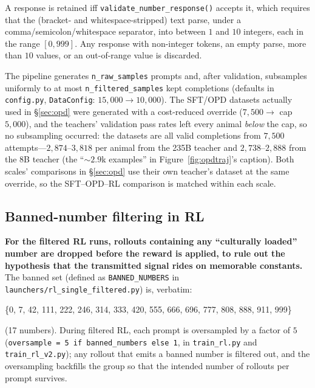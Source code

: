 A response is retained iff \texttt{validate\_number\_response()} accepts it,
which requires that the (bracket- and whitespace-stripped) text parse, under a
comma/semicolon/whitespace separator, into between $1$ and $10$ integers, each
in the range $[0, 999]$. Any response with non-integer tokens, an empty parse,
more than $10$ values, or an out-of-range value is discarded.

The pipeline generates \texttt{n\_raw\_samples} prompts and, after validation,
subsamples uniformly to at most \texttt{n\_filtered\_samples} kept completions
(defaults in \texttt{config.py}, \texttt{DataConfig}: $15{,}000\to10{,}000$).
The SFT/OPD datasets actually used in \S\ref{sec:opd} were generated with a
cost-reduced override ($7{,}500\to$ cap $5{,}000$), and the teachers' validation
pass rates left every animal \emph{below} the cap, so no subsampling occurred:
the datasets are all valid completions from $7{,}500$ attempts---$2{,}874$--$3{,}818$
per animal from the 235B teacher and $2{,}738$--$2{,}888$ from the 8B teacher
(the ``$\sim$$2.9$k examples'' in Figure~\ref{fig:opdtraj}'s caption). Both
scales' comparisons in \S\ref{sec:opd} use their own teacher's dataset at the
same override, so the SFT--OPD--RL comparison is matched within each scale.

\subsection{Banned-number filtering in RL}

\textbf{For the filtered RL runs, rollouts containing any ``culturally loaded''
number are dropped before the reward is applied, to rule out the hypothesis that
the transmitted signal rides on memorable constants.}
The banned set (defined as \texttt{BANNED\_NUMBERS} in
\texttt{launchers/rl\_single\_filtered.py}) is, verbatim:

\begin{tcolorbox}[colback=gray!5,colframe=gray!50,breakable]
\footnotesize\ttfamily
\{0, 7, 42, 111, 222, 246, 314, 333, 420, 555, 666, 696, 777, 808, 888, 911, 999\}
\end{tcolorbox}

\noindent (17 numbers). During filtered RL, each prompt is oversampled by a
factor of $5$ (\texttt{oversample = 5 if banned\_numbers else 1}, in
\texttt{train\_rl.py} and \texttt{train\_rl\_v2.py}); any rollout that emits a
banned number is filtered out, and the oversampling backfills the group so that
the intended number of rollouts per prompt survives.

